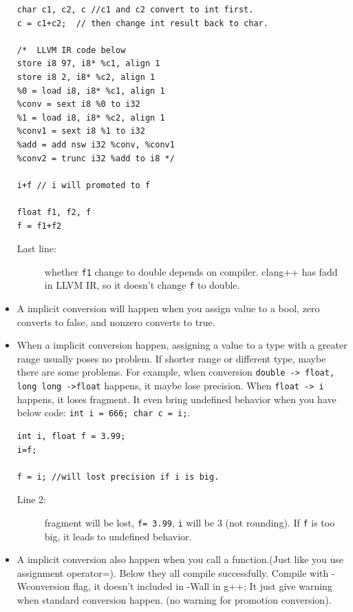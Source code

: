 \documentclass[a4paper,11pt,twoside]{book}
\begin{document}
\begin{itemize}
\begin{lstlisting}
char c1, c2, c //c1 and c2 convert to int first.
c = c1+c2;  // then change int result back to char.

/*  LLVM IR code below
store i8 97, i8* %c1, align 1
store i8 2, i8* %c2, align 1
%0 = load i8, i8* %c1, align 1
%conv = sext i8 %0 to i32
%1 = load i8, i8* %c2, align 1
%conv1 = sext i8 %1 to i32
%add = add nsw i32 %conv, %conv1
%conv2 = trunc i32 %add to i8 */

i+f // i will promoted to f

float f1, f2, f
f = f1+f2 
\end{lstlisting}
	
	\begin{description}
		\item[Last line:] whether \texttt{f1} change to double depends on compiler. clang++ has fadd in LLVM IR, so it doesn't change \texttt{f} to double.
	\end{description}
	
	\item A implicit conversion will happen when you assign value to a bool, zero converts to false, and nonzero converts to true.
	
	\item When a implicit conversion happen, assigning a value to a type with a greater range usually poses no problem. If shorter range or different type, maybe there are some problems. For example, when conversion \texttt{double -> float, long long ->float} happens, it maybe lose precision. When \texttt{float -> i} happens, it loses fragment. It even bring undefined behavior when you have below code: \texttt{int i = 666; char c = i;}.
	
\begin{lstlisting}
int i, float f = 3.99;
i=f;

f = i; //will lost precision if i is big.
\end{lstlisting}
	\begin{description}
		\item[Line 2:] fragment will be lost,  \texttt{f= 3.99}, \texttt{i} will be 3 (not rounding). If \texttt{f} is too big, it leads to undefined behavior.
	\end{description}
	
	\item A implicit conversion also happen when you call a function.(Just like you use assignment operator=). Below they all compile successfully. Compile with -Wconversion flag, it doesn't included in -Wall in g++; It just give warning when standard conversion happen. (no warning for promotion conversion).


\end{itemize}
\end{document}
